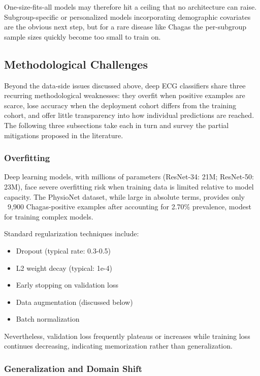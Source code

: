 One-size-fits-all models may therefore hit a ceiling that no architecture can raise. Subgroup-specific or personalized models incorporating demographic covariates are the obvious next step, but for a rare disease like Chagas the per-subgroup sample sizes quickly become too small to train on.

\subsection{Methodological Challenges}

Beyond the data-side issues discussed above, deep ECG classifiers share three recurring methodological weaknesses: they overfit when positive examples are scarce, lose accuracy when the deployment cohort differs from the training cohort, and offer little transparency into how individual predictions are reached. The following three subsections take each in turn and survey the partial mitigations proposed in the literature.

\subsubsection{Overfitting}

Deep learning models, with millions of parameters (ResNet-34: 21M; ResNet-50: 23M), face severe overfitting risk when training data is limited relative to model capacity. The PhysioNet dataset, while large in absolute terms, provides only ~9,900 Chagas-positive examples after accounting for 2.70\% prevalence, modest for training complex models.

Standard regularization techniques include:
\begin{itemize}
    \item Dropout (typical rate: 0.3-0.5)
    \item L2 weight decay (typical: 1e-4)
    \item Early stopping on validation loss
    \item Data augmentation (discussed below)
    \item Batch normalization
\end{itemize}

Nevertheless, validation loss frequently plateaus or increases while training loss continues decreasing, indicating memorization rather than generalization.

\subsubsection{Generalization and Domain Shift}

